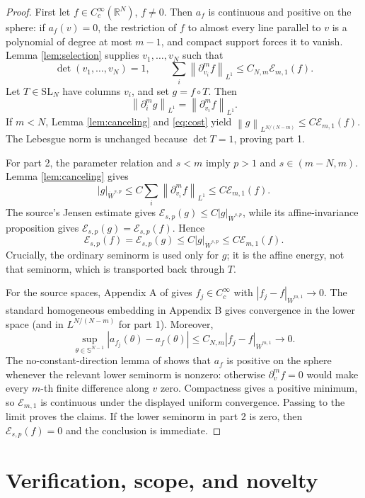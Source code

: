 \documentclass[11pt]{article}
\newcommand{\R}{\mathbb R}
\newcommand{\Sph}{\mathbb S}
\newcommand{\E}{\mathscr E}
\newcommand{\norm}[1]{\left\lVert #1\right\rVert}
\newcommand{\abs}[1]{\left\lvert #1\right\rvert}
\begin{document}
\begin{proof}
First let \(f\in C_c^\infty(\R^N)\), \(f\neq0\).  Then \(a_f\) is continuous
and positive on the sphere: if \(a_f(v)=0\), the restriction of \(f\) to
almost every line parallel to \(v\) is a polynomial of degree at most
\(m-1\), and compact support forces it to vanish.  Lemma
\ref{lem:selection} supplies \(v_1,\ldots,v_N\) such that
\begin{equation}\label{eq:cost}
 \det(v_1,\ldots,v_N)=1,\qquad
 \sum_i\norm{\partial_{v_i}^m f}_{L^1}
 \leq C_{N,m}\E_{m,1}(f).
\end{equation}
Let \(T\in\mathrm{SL}_N\) have columns \(v_i\), and set \(g=f\circ T\).
Then
\[
 \norm{\partial_i^m g}_{L^1}
 =\norm{\partial_{v_i}^m f}_{L^1}.
\]
If \(m<N\), Lemma \ref{lem:canceling} and \eqref{eq:cost} yield
\(\norm{g}_{L^{N/(N-m)}}\leq C\E_{m,1}(f)\).  The Lebesgue norm is unchanged
because \(\det T=1\), proving part 1.

For part 2, the parameter relation and \(s<m\) imply \(p>1\) and
\(s\in(m-N,m)\).  Lemma \ref{lem:canceling} gives
\[
 \abs{g}_{\dot W^{s,p}}
 \leq C\sum_i\norm{\partial_{v_i}^m f}_{L^1}
 \leq C\E_{m,1}(f).
\]
The source's Jensen estimate gives
\(\E_{s,p}(g)\leq C\abs{g}_{\dot W^{s,p}}\), while its affine-invariance
proposition gives \(\E_{s,p}(g)=\E_{s,p}(f)\).  Hence
\[
 \E_{s,p}(f)=\E_{s,p}(g)
 \leq C\abs{g}_{\dot W^{s,p}}
 \leq C\E_{m,1}(f).
\]
Crucially, the ordinary seminorm is used only for \(g\); it is the affine
energy, not that seminorm, which is transported back through \(T\).

For the source spaces, Appendix A of \cite{BG} gives
\(f_j\in C_c^\infty\) with
\(\abs{f_j-f}_{\dot W^{m,1}}\to0\).  The standard homogeneous embedding in
Appendix B gives convergence in the lower space (and in
\(L^{N/(N-m)}\) for part 1).  Moreover,
\[
 \sup_{\theta\in\Sph^{N-1}}
 \abs{a_{f_j}(\theta)-a_f(\theta)}
 \leq C_{N,m}\abs{f_j-f}_{\dot W^{m,1}}\longrightarrow0.
\]
The no-constant-direction lemma of \cite{BG} shows that \(a_f\) is positive
on the sphere whenever the relevant lower seminorm is nonzero: otherwise
\(\partial_v^m f=0\) would make every \(m\)-th finite difference along \(v\)
zero.  Compactness gives a positive minimum, so \(\E_{m,1}\) is continuous
under the displayed uniform convergence.  Passing to the limit proves the
claims.  If the lower seminorm in part 2 is zero, then
\(\E_{s,p}(f)=0\) and the conclusion is immediate.
\end{proof}

\section{Verification, scope, and novelty}
\end{document}
